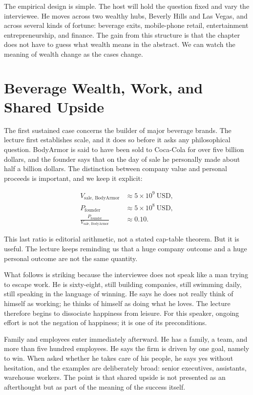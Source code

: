 The empirical design is simple. The host will hold the question fixed and vary the interviewee. He moves across two wealthy hubs, Beverly Hills and Las Vegas, and across several kinds of fortune: beverage exits, mobile-phone retail, entertainment entrepreneurship, and finance. The gain from this structure is that the chapter does not have to guess what wealth means in the abstract. We can watch the meaning of wealth change as the cases change.

\section{Beverage Wealth, Work, and Shared Upside}

The first sustained case concerns the builder of major beverage brands. The lecture first establishes scale, and it does so before it asks any philosophical question. BodyArmor is said to have been sold to Coca-Cola for over five billion dollars, and the founder says that on the day of sale he personally made about half a billion dollars. The distinction between company value and personal proceeds is important, and we keep it explicit:

\begin{align}
V_{\text{sale, BodyArmor}} &\approx 5 \times 10^{9}\ \mathrm{USD},\\
P_{\text{founder}} &\approx 5 \times 10^{8}\ \mathrm{USD},\\
\frac{P_{\text{founder}}}{V_{\text{sale, BodyArmor}}} &\approx 0.10.
\end{align}

This last ratio is editorial arithmetic, not a stated cap-table theorem. But it is useful. The lecture keeps reminding us that a huge company outcome and a huge personal outcome are not the same quantity.

What follows is striking because the interviewee does not speak like a man trying to escape work. He is sixty-eight, still building companies, still swimming daily, still speaking in the language of winning. He says he does not really think of himself as working; he thinks of himself as doing what he loves. The lecture therefore begins to dissociate happiness from leisure. For this speaker, ongoing effort is not the negation of happiness; it is one of its preconditions.

Family and employees enter immediately afterward. He has a family, a team, and more than five hundred employees. He says the firm is driven by one goal, namely to win. When asked whether he takes care of his people, he says yes without hesitation, and the examples are deliberately broad: senior executives, assistants, warehouse workers. The point is that shared upside is not presented as an afterthought but as part of the meaning of the success itself.

